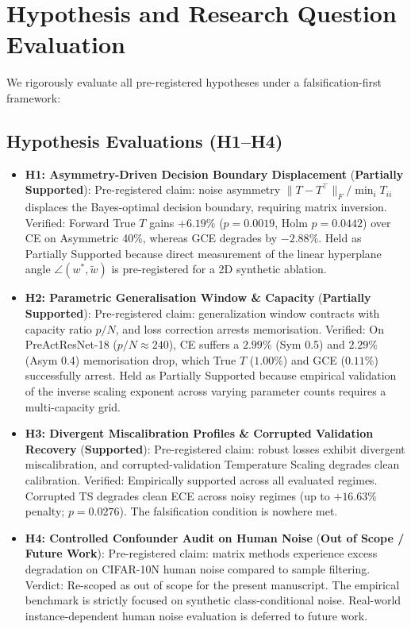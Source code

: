 \documentclass[10pt,twocolumn]{article}
\theoremstyle{definition}
\begin{document}
\section{Hypothesis and Research Question Evaluation}



We rigorously evaluate all pre-registered hypotheses under a falsification-first framework:

\subsection{Hypothesis Evaluations (H1--H4)}
\begin{itemize}
    \item \textbf{H1: Asymmetry-Driven Decision Boundary Displacement} (\textbf{Partially Supported}): Pre-registered claim: noise asymmetry $\|T - T^\top\|_F / \min_i T_{ii}$ displaces the Bayes-optimal decision boundary, requiring matrix inversion. Verified: Forward True $T$ gains $+6.19\%$ ($p=0.0019$, Holm $p=0.0442$) over CE on Asymmetric 40\%, whereas GCE degrades by $-2.88\%$. Held as Partially Supported because direct measurement of the linear hyperplane angle $\angle(w^*, \tilde{w})$ is pre-registered for a 2D synthetic ablation.
    \item \textbf{H2: Parametric Generalisation Window \& Capacity} (\textbf{Partially Supported}): Pre-registered claim: generalization window contracts with capacity ratio $p/N$, and loss correction arrests memorisation. Verified: On PreActResNet-18 ($p/N \approx 240$), CE suffers a $2.99\%$ (Sym 0.5) and $2.29\%$ (Asym 0.4) memorisation drop, which True $T$ ($1.00\%$) and GCE ($0.11\%$) successfully arrest. Held as Partially Supported because empirical validation of the inverse scaling exponent across varying parameter counts requires a multi-capacity grid.
    \item \textbf{H3: Divergent Miscalibration Profiles \& Corrupted Validation Recovery} (\textbf{Supported}): Pre-registered claim: robust losses exhibit divergent miscalibration, and corrupted-validation Temperature Scaling degrades clean calibration. Verified: Empirically supported across all evaluated regimes. Corrupted TS degrades clean ECE across noisy regimes (up to $+16.63\%$ penalty; $p=0.0276$). The falsification condition is nowhere met.
    \item \textbf{H4: Controlled Confounder Audit on Human Noise} (\textbf{Out of Scope / Future Work}): Pre-registered claim: matrix methods experience excess degradation on CIFAR-10N human noise compared to sample filtering. Verdict: Re-scoped as out of scope for the present manuscript. The empirical benchmark is strictly focused on synthetic class-conditional noise. Real-world instance-dependent human noise evaluation is deferred to future work.
\end{itemize}
\end{document}
